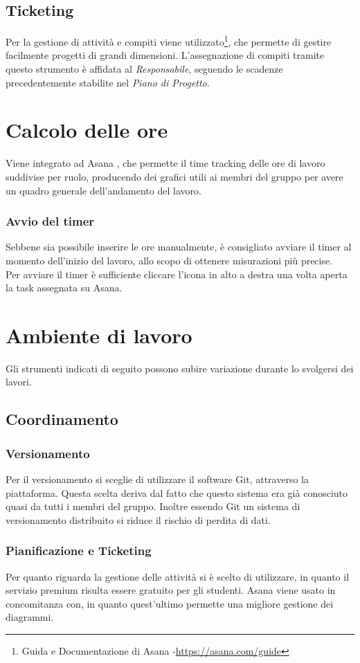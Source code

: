 \subsection{Ticketing}
Per la gestione di attività e compiti viene utilizzato\footnote{Guida e Documentazione di Asana -\url{https://asana.com/guide}}, che permette di gestire facilmente progetti di grandi dimensioni.
L'assegnazione di compiti tramite questo strumento è affidata al \textit{Responsabile}, seguendo le scadenze precedentemente stabilite nel \textit{Piano di Progetto}.

\section{Calcolo delle ore} \label{calcoloOre}
Viene integrato ad Asana , che permette il time tracking delle ore di lavoro suddivise per ruolo, producendo dei grafici utili ai membri del gruppo per avere un quadro generale dell'andamento del lavoro.
\subsubsection{Avvio del timer}
Sebbene sia possibile inserire le ore manualmente, è consigliato avviare il timer al momento dell'inizio del lavoro, allo scopo di ottenere misurazioni più precise.\\
Per avviare il timer è sufficiente cliccare l'icona in alto a destra una volta aperta la task assegnata su Asana.

\section{Ambiente di lavoro}
Gli strumenti indicati di seguito possono subire variazione durante lo svolgersi dei lavori.
\subsection{Coordinamento}
\subsubsection{Versionamento}
Per il versionamento si sceglie di utilizzare il software Git, attraverso la piattaforma. Questa scelta deriva dal fatto che questo sistema era già conosciuto quasi da tutti i membri del gruppo. Inoltre essendo Git un sistema di versionamento distribuito si riduce il rischio di perdita di dati. 
\subsubsection{Pianificazione e Ticketing}
Per quanto riguarda la gestione delle attività si è scelto di utilizzare, in quanto il servizio premium risulta essere gratuito per gli studenti. Asana viene usato in concomitanza con, in quanto quest'ultimo permette una migliore gestione dei diagrammi.
